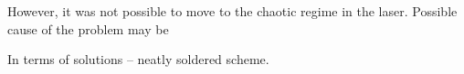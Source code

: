 However, it was not possible to move to the chaotic regime in the laser. Possible cause of the problem may be
\begin{itemize}
\end{itemize}
In terms of solutions -- neatly soldered scheme.



